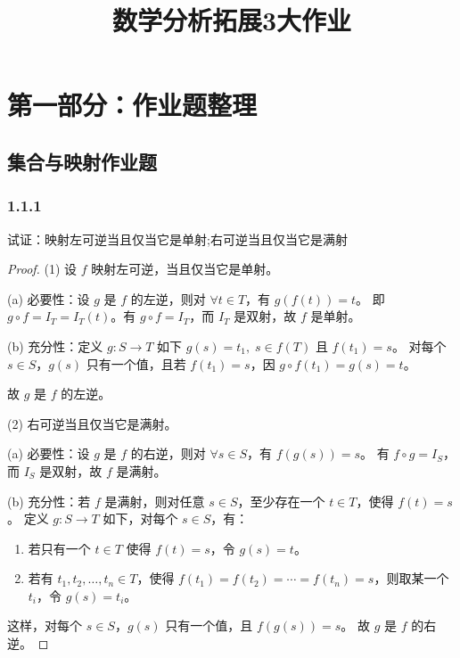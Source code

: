 \documentclass[12pt]{ctexart}
\begin{document}
\title{数学分析拓展3大作业} %
\newpage
\tableofcontents %
\newpage


\section{第一部分：作业题整理} %
\setcounter{section}{1} %
\setcounter{subsection}{0} %
\subsection{集合与映射作业题} 
\subsubsection*{1.1.1}
试证：映射左可逆当且仅当它是单射;右可逆当且仅当它是满射

\begin{proof}
(1) 设 $f$ 映射左可逆，当且仅当它是单射。

\noindent
(a) 必要性：设 $g$ 是 $f$ 的左逆，则对 $\forall t \in T$，有 $g(f(t)) = t$。  
即 $g \circ f = I_T = I_T(t)$。有 $g \circ f = I_T$，而 $I_T$ 是双射，故 $f$ 是单射。

\noindent
(b) 充分性：定义 $g: S \to T$ 如下 $g(s) = t_1, \; s \in f(T)$ 且 $f(t_1) = s$。  
对每个 $s \in S$，$g(s)$ 只有一个值，且若 $f(t_1) = s$，因 $g \circ f(t_1) = g(s) = t$。

\noindent
故 $g$ 是 $f$ 的左逆。

(2) 右可逆当且仅当它是满射。

\noindent
(a) 必要性：设 $g$ 是 $f$ 的右逆，则对 $\forall s \in S$，有 $f(g(s)) = s$。  
有 $f \circ g = I_S$，而 $I_S$ 是双射，故 $f$ 是满射。

\noindent
(b) 充分性：若 $f$ 是满射，则对任意 $s \in S$，至少存在一个 $t \in T$，使得 $f(t) = s$。  
定义 $g: S \to T$ 如下，对每个 $s \in S$，有：
\begin{enumerate}
    \item 若只有一个 $t \in T$ 使得 $f(t) = s$，令 $g(s) = t$。
    \item 若有 $t_1, t_2, \ldots, t_n \in T$，使得 $f(t_1) = f(t_2) = \cdots = f(t_n) = s$，则取某一个 $t_i$，令 $g(s) = t_i$。
\end{enumerate}
这样，对每个 $s \in S$，$g(s)$ 只有一个值，且 $f(g(s)) = s$。  
故 $g$ 是 $f$ 的右逆。

\end{proof}
\end{document}
